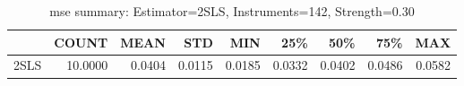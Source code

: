 \begin{table}[ht]
\centering
\caption{mse summary: Estimator=2SLS, Instruments=142, Strength=0.30}
\begin{tabular}{lrrrrrrrr}
\toprule
 & COUNT & MEAN & STD & MIN & 25\% & 50\% & 75\% & MAX \\
\midrule
2SLS & 10.0000 & 0.0404 & 0.0115 & 0.0185 & 0.0332 & 0.0402 & 0.0486 & 0.0582 \\
\bottomrule
\end{tabular}
\end{table}
